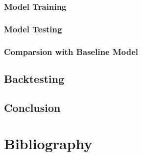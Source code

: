 \documentclass[11pt,a4paper]{article}
\begin{document}
    \subsubsection{Model Training}
    
    \subsubsection{Model Testing}
    
    \subsubsection{Comparsion with Baseline Model}
    
    \subsection{Backtesting}
    
    \subsection{Conclusion}
    
    \newpage
    \section{Bibliography}
    
    
\end{document}
